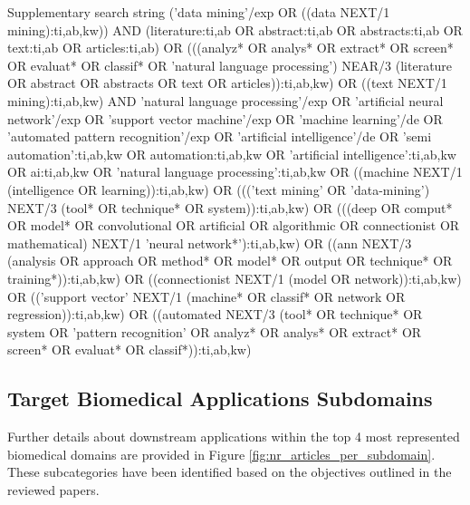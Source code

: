 \documentclass[fleqn,10pt]{olplainarticle}
\begin{document}
Supplementary search string
('data mining'/exp OR ((data NEXT/1 mining):ti,ab,kw)) AND (literature:ti,ab OR abstract:ti,ab OR abstracts:ti,ab OR text:ti,ab OR articles:ti,ab) OR (((analyz* OR analys* OR extract* OR screen* OR evaluat* OR classif* OR 'natural language processing') NEAR/3 (literature OR abstract OR abstracts OR text OR articles)):ti,ab,kw) OR ((text NEXT/1 mining):ti,ab,kw)
AND
'natural language processing'/exp OR 'artificial neural network'/exp OR 'support vector machine'/exp OR 'machine learning'/de OR 'automated pattern recognition'/exp OR 'artificial intelligence'/de OR 'semi automation':ti,ab,kw OR automation:ti,ab,kw OR 'artificial intelligence':ti,ab,kw OR ai:ti,ab,kw OR 'natural language processing':ti,ab,kw OR ((machine NEXT/1 (intelligence OR learning)):ti,ab,kw) OR ((('text mining' OR 'data-mining') NEXT/3 (tool* OR technique* OR system)):ti,ab,kw) OR (((deep OR comput* OR model* OR convolutional OR artificial OR algorithmic OR connectionist OR mathematical) NEXT/1 'neural network*'):ti,ab,kw) OR ((ann NEXT/3 (analysis OR approach OR method* OR model* OR output OR technique* OR training*)):ti,ab,kw) OR ((connectionist NEXT/1 (model OR network)):ti,ab,kw) OR (('support vector' NEXT/1 (machine* OR classif* OR network OR regression)):ti,ab,kw) OR ((automated NEXT/3 (tool* OR technique* OR system OR 'pattern recognition' OR analyz* OR analys* OR extract* OR screen* OR evaluat* OR classif*)):ti,ab,kw)

\subsection*{Target Biomedical Applications Subdomains}
Further details about downstream applications within the top 4 most represented biomedical domains are provided in Figure \ref{fig:nr_articles_per_subdomain}. These subcategories have been identified based on the objectives outlined in the reviewed papers.
\end{document}
